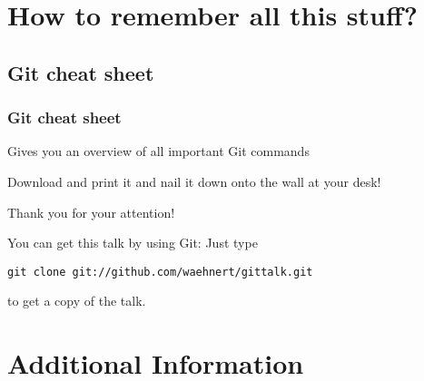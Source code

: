 \documentclass{beamer}
\begin{document}
\section{How to remember all this stuff?}
\subsection{Git cheat sheet}
\begin{frame}
  \frametitle{Git cheat sheet}
  Gives you an overview of all important Git commands
  \begin{center}
  \end{center}
  Download and print it and nail it down onto the wall at your desk!
\end{frame}

\begin{frame}
  \begin{center}{}
    \begin{LARGE}
      Thank you for your attention!
    \end{LARGE}
  \end{center}\bigskip

You can get this talk by using Git: Just type\smallskip

\quad\texttt{git clone git://github.com/waehnert/gittalk.git}\smallskip

to get a copy of the talk.
\end{frame}

\section*{Additional Information}
\end{document}
